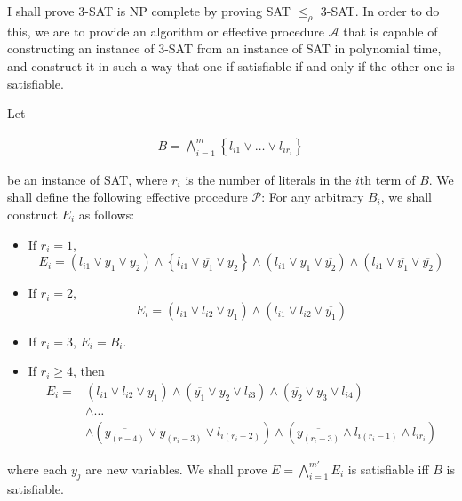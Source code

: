\documentclass[a4paper, 12pt]{article}
\begin{document}
I shall prove $3$-SAT is NP complete by proving SAT $\leq_\rho$ $3$-SAT. In order 
to do this, we are to provide an algorithm or effective procedure $\mathcal{A}$
that is capable of constructing an instance of $3$-SAT from an instance 
of SAT in polynomial time, and construct it in such a way that one if 
satisfiable if and only if the other one is satisfiable.  

Let 

\begin{align*}
    B = \bigwedge_{i=1}^{m} \left\{ l_{i 1} \lor  \ldots \lor l_{i r_i} \right\} 
\end{align*}

be an instance of SAT, where $r_i$ is the number of literals in the $i$th term 
of $B$. We shall define the following effective procedure $\mathcal{P}$: For any
arbitrary $B_i$, we shall construct $E_i$ as follows:

\begin{itemize}
    \item If $r_i = 1$, 
        $$E_i = \left( l_{i 1} \lor y_{ 1} \lor  y_{2} \right) \land \left\{
        l_{i 1} \lor  \overline{y_{ 1}} \lor  y_{ 2} \right\} \land \left(
    l_{i 1} \lor y_{ 1} \lor  \overline{y_{ 2}} \right) \land \left( l_{i 1}
\lor  \overline{y_{ 1}} \lor  \overline{y_{ 2}} \right)   $$
    \item If $r_{i} = 2$, 
        \begin{equation*}
            E_i = (l_{i 1} \lor  l_{i 2} \lor  y_{ 1}) \land  (l_{i 1} \lor  l_{i 2} \lor  \overline{y_{ 1}})
        \end{equation*}
    \item If $r_{i} = 3$, $E_i = B_i$.
    \item If $r_i \geq 4$, then 
        \begin{align*}
            E_i = &(l_{i 1} \lor  l_{i 2} \lor  y_{ 1}) \land (\overline{y_{ 1}} \lor  y_{ 2} \lor  l_{i 3}) \land (\overline{y_{ 2}} \lor  y_{ 3} \lor l_{i 4}) \\ 
                  &\land  \ldots \\ 
                  &\land (\overline{y_{ (r-4)}} \lor  y_{(r_i-3)} \lor  l_{i(r_i-2)}) \land (\overline{y_{ (r_i-3)}} \land l_{i(r_i-1)} \land l_{ir_i})
        \end{align*}
\end{itemize}

where each $y_{j}$ are new variables. We shall prove $E = \bigwedge_{i=1}^{m'}
E_i$ is satisfiable iff $B$ is satisfiable.
\end{document}
